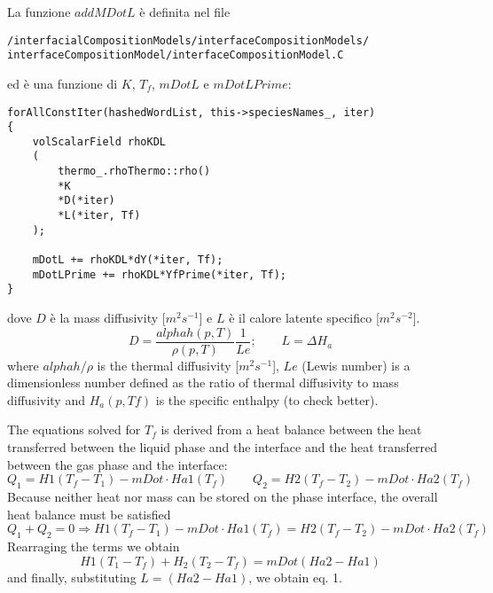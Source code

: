 \documentclass[]{report}
\begin{document}
La funzione $addMDotL$ \`{e} definita nel file 
\begin{verbatim}
/interfacialCompositionModels/interfaceCompositionModels/
interfaceCompositionModel/interfaceCompositionModel.C
\end{verbatim}
ed è una funzione di $K$, $T_f$, $mDotL$ e $mDotLPrime$:
\begin{verbatim}
forAllConstIter(hashedWordList, this->speciesNames_, iter)
{
    volScalarField rhoKDL
    (
		thermo_.rhoThermo::rho()
		*K
		*D(*iter)
		*L(*iter, Tf)
	);

	mDotL += rhoKDL*dY(*iter, Tf);
	mDotLPrime += rhoKDL*YfPrime(*iter, Tf);
}
\end{verbatim}
dove $D$ \`{e} la mass diffusivity [$m^2 s^{-1}$] e $L$ \`{e} il calore latente specifico [$m^2 s^{-2}$].
\begin{equation}
D=\frac{alphah(p,T)}{\rho(p,T)}\frac{1}{Le}; \qquad  L=\Delta H_a
\end{equation}
where $alphah/\rho$ is the thermal diffusivity [$m^{2}s^{-1}$], $Le$ (Lewis number) is a dimensionless number defined as the ratio of thermal diffusivity to mass diffusivity and $H_a(p,Tf)$ is the specific enthalpy (to check better).

The equations solved for $T_f$ is derived from a heat balance between the heat transferred between the liquid phase and the interface and the heat transferred between the gas phase and the interface:
\begin{equation}
Q_1 = H1(T_f-T_1)-mDot\cdot Ha1(T_f)\qquad Q_2 = H2(T_f-T_2)-mDot\cdot Ha2(T_f)
\end{equation}
Because neither heat nor mass can be stored on the phase interface, the overall heat balance must be satisfied
\begin{equation}
Q_1+Q_2=0 \Rightarrow  H1(T_f-T_1)-mDot\cdot Ha1(T_f) =  H2(T_f-T_2)-mDot\cdot Ha2(T_f)
\end{equation}
Rearraging the terms we obtain 
\begin{equation}
H1(T_1-T_f)+H_2(T_2-T_f)=mDot(Ha2-Ha1)
\end{equation}
and finally, substituting $L=(Ha2-Ha1)$, we obtain eq. 1.
\end{document}
